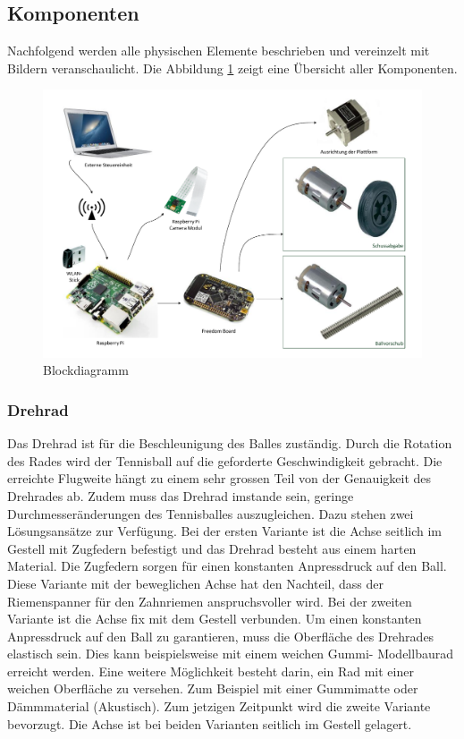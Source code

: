 \subsection{Komponenten}
Nachfolgend werden alle physischen Elemente beschrieben und vereinzelt mit Bildern veranschaulicht. Die Abbildung \ref{fig:blockdiagramm} zeigt eine Übersicht aller Komponenten.

\begin{figure}[h!]
	\centering
	\includegraphics[width=0.9\linewidth]{../../fig/blockdiagramm}
	\caption{Blockdiagramm}
	\label{fig:blockdiagramm}
\end{figure}

\subsubsection{Drehrad}
Das Drehrad ist für die Beschleunigung des Balles zuständig. Durch die Rotation des Rades wird der Tennisball auf die geforderte Geschwindigkeit gebracht. Die erreichte Flugweite hängt zu einem sehr grossen Teil von der Genauigkeit des Drehrades ab. Zudem muss das Drehrad imstande sein, geringe Durchmesseränderungen des Tennisballes auszugleichen. Dazu stehen zwei Lösungsansätze zur Verfügung. Bei der ersten Variante ist die Achse seitlich im Gestell mit Zugfedern befestigt und das Drehrad besteht aus einem harten Material. Die Zugfedern sorgen für einen konstanten Anpressdruck auf den Ball. Diese Variante mit der beweglichen Achse hat den Nachteil, dass der Riemenspanner für den Zahnriemen anspruchsvoller wird. Bei der zweiten Variante ist die Achse fix mit dem Gestell verbunden. Um einen konstanten Anpressdruck auf den Ball zu garantieren, muss die Oberfläche des Drehrades elastisch sein. Dies kann beispielsweise mit einem weichen Gummi- Modellbaurad erreicht werden. Eine weitere Möglichkeit besteht darin, ein Rad mit einer weichen Oberfläche zu versehen. Zum Beispiel mit einer Gummimatte oder Dämmmaterial (Akustisch). Zum jetzigen Zeitpunkt wird die zweite Variante bevorzugt. Die Achse ist bei beiden Varianten seitlich im Gestell gelagert.

